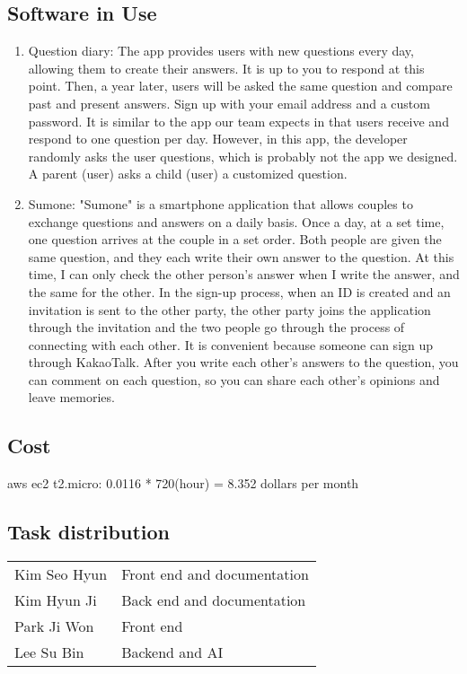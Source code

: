 \documentclass[conference]{IEEEtran}
\begin{document}
\subsection{Software in Use}
    \begin{enumerate}
        \item Question diary:
        The app provides users with new questions every day, allowing them to create their answers. It is up to you to respond at this point. Then, a year later, users will be asked the same question and compare past and present answers. Sign up with your email address and a custom password. It is similar to the app our team expects in that users receive and respond to one question per day. However, in this app, the developer randomly asks the user questions, which is probably not the app we designed. A parent (user) asks a child (user) a customized question.
        \item Sumone:
        "Sumone" is a smartphone application that allows couples to exchange questions and answers on a daily basis. Once a day, at a set time, one question arrives at the couple in a set order. Both people are given the same question, and they each write their own answer to the question. At this time, I can only check the other person's answer when I write the answer, and the same for the other. In the sign-up process, when an ID is created and an invitation is sent to the other party, the other party joins the application through the invitation and the two people go through the process of connecting with each other. It is convenient because someone can sign up through KakaoTalk. After you write each other's answers to the question, you can comment on each question, so you can share each other's opinions and leave memories.
    \end{enumerate}
\subsection{Cost}
aws ec2 t2.micro: 0.0116 * 720(hour) = 8.352 dollars per month

\subsection{Task distribution}
\begin{table}[H]
    \centering
    \begin{tabular}{m{3cm}|m{4cm}}
    \toprule
    Kim Seo Hyun & Front end and documentation \\
    Kim Hyun Ji & Back end and documentation\\
    Park Ji Won & Front end\\
    Lee Su Bin & Backend and AI\\
    \bottomrule
    \end{tabular}
    \end{table}
\end{document}
